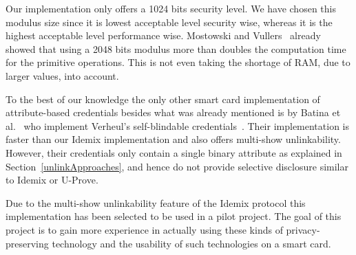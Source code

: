 Our implementation only offers a 1024 bits security level. We have chosen this
modulus size since it is lowest acceptable level security wise, whereas it is
the highest acceptable level performance wise. Mostowski and
Vullers~\cite{MostowskiVullers11} already showed that using a 2048 bits modulus
more than doubles the computation time for the primitive operations. This is
not even taking the shortage of RAM, due to larger values, into account.

To the best of our knowledge the only other smart card implementation of
attribute-based credentials besides what was already mentioned is by Batina et
al.~\cite{BatinaHJMV10} who implement Verheul's self-blindable
credentials~\cite{Verheul01}. Their implementation is faster than our Idemix
implementation and also offers multi-show unlinkability. However, their
credentials only contain a single binary attribute as explained in
Section~\ref{unlinkApproaches}, and hence do not provide selective disclosure
similar to Idemix or U-Prove.

Due to the multi-show unlinkability feature of the Idemix protocol this
implementation has been selected to be used in a pilot project. The goal of this
project is to gain more experience in actually using these kinds of
privacy-preserving technology and the usability of such technologies on a smart
card.